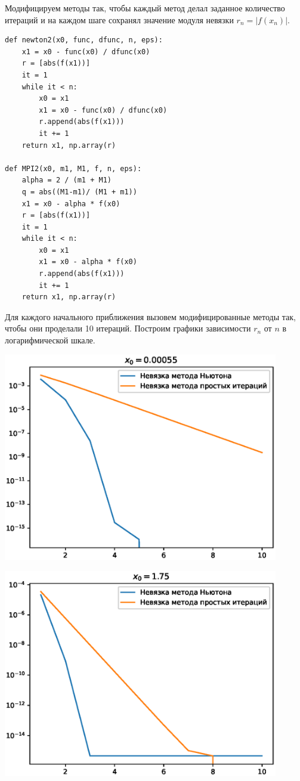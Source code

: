 Модифицируем методы так, чтобы каждый метод делал заданное количество итераций и на каждом шаге сохранял значение модуля невязки $r_n = |f(x_n)|$.
\begin{verbatim}
def newton2(x0, func, dfunc, n, eps):
    x1 = x0 - func(x0) / dfunc(x0)
    r = [abs(f(x1))]
    it = 1
    while it < n:
        x0 = x1
        x1 = x0 - func(x0) / dfunc(x0)
        r.append(abs(f(x1)))
        it += 1
    return x1, np.array(r)

def MPI2(x0, m1, M1, f, n, eps):
    alpha = 2 / (m1 + M1)
    q = abs((M1-m1)/ (M1 + m1))
    x1 = x0 - alpha * f(x0)
    r = [abs(f(x1))]
    it = 1
    while it < n:
        x0 = x1
        x1 = x0 - alpha * f(x0)
        r.append(abs(f(x1)))
        it += 1
    return x1, np.array(r)
\end{verbatim}

Для каждого начального приближения вызовем модифицированные методы так, чтобы они проделали 10 итераций. Построим графики зависимости $r_n$ от $n$ в логарифмической шкале.

\includegraphics[width=12cm]{222_0.eps}

\includegraphics[width=12cm]{222_1.eps}

